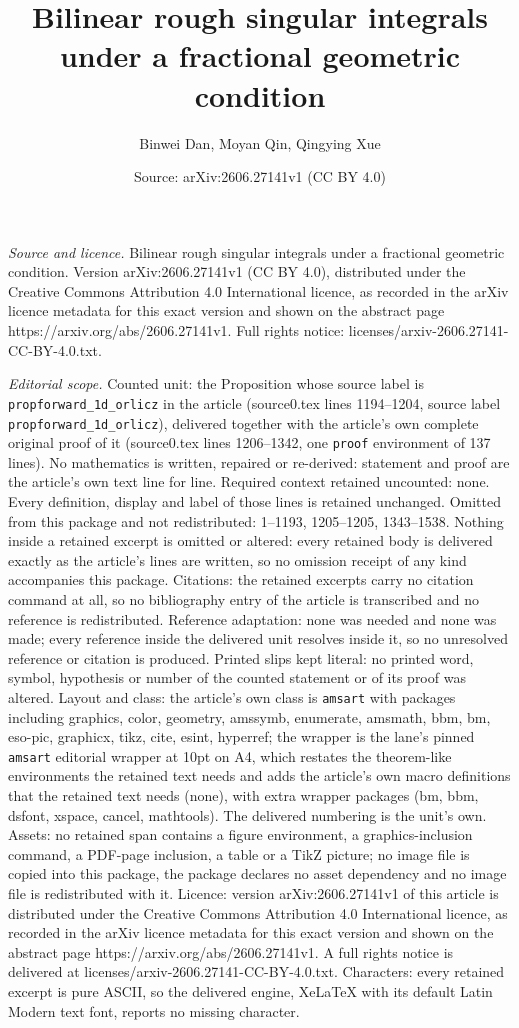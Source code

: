 \documentclass[10pt,a4paper]{amsart}
\title[Bilinear rough singular integrals under a fractional geometr]{Bilinear rough singular integrals under a fractional geometric condition}
\author{Binwei Dan, Moyan Qin, Qingying Xue}
\date{Source: arXiv:2606.27141v1 (CC BY 4.0)}
\begin{document}
\maketitle

\noindent\emph{Source and licence.} Bilinear rough singular integrals under a fractional geometric condition. Version arXiv:2606.27141v1 (CC BY 4.0), distributed under the Creative Commons Attribution 4.0 International licence, as recorded in the arXiv licence metadata for this exact version and shown on the abstract page https://arxiv.org/abs/2606.27141v1. Full rights notice: licenses/arxiv-2606.27141-CC-BY-4.0.txt.\par\smallskip

\noindent\textit{Editorial scope.} Counted unit: the Proposition whose source label is \texttt{propforward\_1d\_orlicz} in the article (source0.tex lines 1194--1204, source label \texttt{propforward\_1d\_orlicz}), delivered together with the article's own complete original proof of it (source0.tex lines 1206--1342, one \texttt{proof} environment of 137 lines). No mathematics is written, repaired or re-derived: statement and proof are the article's own text line for line. Required context retained uncounted: none. Every definition, display and label of those lines is retained unchanged. Omitted from this package and not redistributed: 1--1193, 1205--1205, 1343--1538. Nothing inside a retained excerpt is omitted or altered: every retained body is delivered exactly as the article's lines are written, so no omission receipt of any kind accompanies this package. Citations: the retained excerpts carry no citation command at all, so no bibliography entry of the article is transcribed and no reference is redistributed. Reference adaptation: none was needed and none was made; every reference inside the delivered unit resolves inside it, so no unresolved reference or citation is produced. Printed slips kept literal: no printed word, symbol, hypothesis or number of the counted statement or of its proof was altered. Layout and class: the article's own class is \texttt{amsart} with packages including graphics, color, geometry, amssymb, enumerate, amsmath, bbm, bm, eso-pic, graphicx, tikz, cite, esint, hyperref; the wrapper is the lane's pinned \texttt{amsart} editorial wrapper at 10pt on A4, which restates the theorem-like environments the retained text needs and adds the article's own macro definitions that the retained text needs (none), with extra wrapper packages (bm, bbm, dsfont, xspace, cancel, mathtools). The delivered numbering is the unit's own. Assets: no retained span contains a figure environment, a graphics-inclusion command, a PDF-page inclusion, a table or a TikZ picture; no image file is copied into this package, the package declares no asset dependency and no image file is redistributed with it. Licence: version arXiv:2606.27141v1 of this article is distributed under the Creative Commons Attribution 4.0 International licence, as recorded in the arXiv licence metadata for this exact version and shown on the abstract page https://arxiv.org/abs/2606.27141v1. A full rights notice is delivered at licenses/arxiv-2606.27141-CC-BY-4.0.txt. Characters: every retained excerpt is pure ASCII, so the delivered engine, XeLaTeX with its default Latin Modern text font, reports no missing character.
\end{document}
